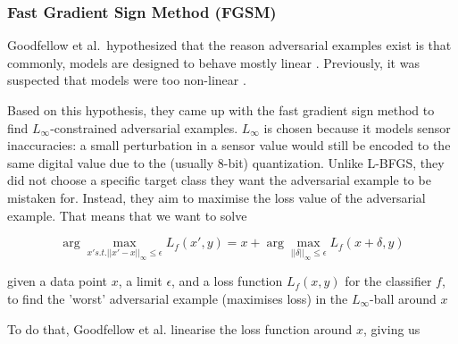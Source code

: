 \documentclass[review]{AIM_report}
\begin{document}
\subsubsection{Fast Gradient Sign Method (FGSM)}\label{sssec:fgsm}
Goodfellow et al.\ hypothesized that the reason adversarial examples exist is that commonly, models are designed to behave mostly linear \cite{goodfellow2014explaining}. Previously, it was suspected that models were too non-linear \cite{szegedy2013intriguing}.

Based on this hypothesis, they came up with the fast gradient sign method to find $L_\infty$-constrained adversarial examples. $L_\infty$ is chosen because it models sensor inaccuracies: a small perturbation in a sensor value would still be encoded to the same digital value due to the (usually 8-bit) quantization. %
Unlike L-BFGS, they did not choose a specific target class they want the adversarial example to be mistaken for. Instead, they aim to maximise the loss value of the adversarial example. That means that we want to solve 

\[\arg\max_{x' s.t. \lvert \lvert x'-x \rvert \rvert_\infty \leq \epsilon} L_f(x', y) = x + \arg\max_{\lvert\lvert\delta\rvert\rvert_\infty\leq\epsilon}L_f(x+\delta, y)\]

given a data point \(x\), a limit \(\epsilon\), and a loss function \(L_f(x, y)\) for the classifier \(f\), to find the 'worst' adversarial example (maximises loss) in the $L_\infty$-ball around $x$

To do that, Goodfellow et al. linearise the loss function around $x$, giving us 
\end{document}
